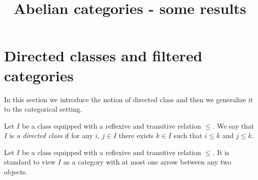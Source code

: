 



\title{Abelian categories - some results}
\date{}
\maketitle

\section{Directed classes and filtered categories}
\noindent
In this section we introduce the notion of directed class and then we generalize it to the categorical setting.

\begin{definition}
Let $I$ be a class equipped with a reflexive and transitive relation $\leq$. We say that $I$ is \textit{a directed class} if for any $i$, $j\in I$ there exists $k\in I$ such that $i\leq k$ and $j\leq k$.
\end{definition}
\noindent
Let $I$ be a class equipped with a reflexive and transitive relation $\leq$. It is standard {\cite[page 11]{Maclane}} to view $I$ as a category with at most one arrow between any two objects.

